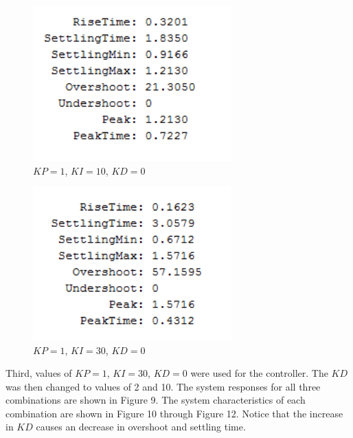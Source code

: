 \documentclass[12pt]{article}
\begin{document}
\newpage

\begin{figure}[h!] %
   \centering
   \includegraphics[width=3in]{2_1100.png} 
   \caption{$KP = 1$, $KI = 10$, $KD = 0$}
   \label{fig:example}
\end{figure}

\bigskip

\begin{figure}[h!] %
   \centering
   \includegraphics[width=3in]{2_1300.png} 
   \caption{$KP = 1$, $KI = 30$, $KD = 0$}
   \label{fig:example}
\end{figure}

\bigskip
\bigskip

Third, values of $KP=1$, $KI=30$, $KD=0$ were used for the controller. The $KD$ was then changed to values of 2 and 10. The system responses for all three combinations are shown in Figure 9. The system characteristics of each combination are shown in Figure 10 through Figure 12. Notice that the increase in $KD$ causes an decrease in overshoot and settling time.

\newpage
\end{document}

